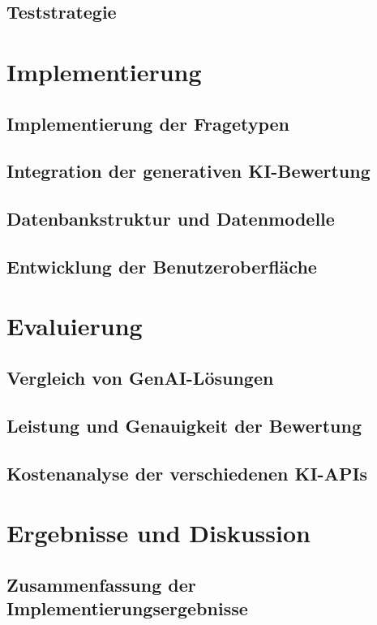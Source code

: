 \documentclass[a4paper,12pt]{article}
\begin{document}
\subsection{Teststrategie}

\newpage

\section{Implementierung}
\subsection{Implementierung der Fragetypen}
\subsection{Integration der generativen KI-Bewertung}
\subsection{Datenbankstruktur und Datenmodelle}
\subsection{Entwicklung der Benutzeroberfläche}

\newpage

\section{Evaluierung}
\subsection{Vergleich von GenAI-Lösungen}
\subsection{Leistung und Genauigkeit der Bewertung}
\subsection{Kostenanalyse der verschiedenen KI-APIs}

\newpage

\section{Ergebnisse und Diskussion}
\subsection{Zusammenfassung der Implementierungsergebnisse}
\end{document}

